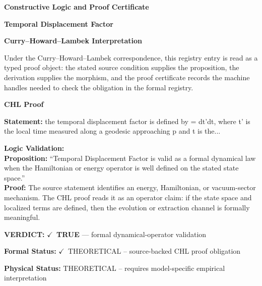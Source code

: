 \clearpage
\begingroup\tzpsupportsetup
\noindent\textbf{\fontsize{10.8pt}{12.8pt}\selectfont [ID 0007] Constructive Logic and Proof Certificate}\par
\noindent\textbf{\fontsize{10pt}{12pt}\selectfont Temporal Displacement Factor}\par
\vspace{0.45em}
\begingroup
\footnotesize
\setlength{\parskip}{0.22em}
\setlength{\parindent}{0pt}
\noindent\textbf{Curry--Howard--Lambek Interpretation}\par
Under the Curry--Howard--Lambek correspondence, this registry entry is read as a typed proof
object: the stated source condition supplies the proposition, the derivation supplies the
morphism, and the proof certificate records the machine handles needed to check the obligation
in the formal registry.

\vspace{0.45em}
\noindent\textbf{CHL Proof}\par
\textbf{Statement:} the temporal displacement factor  is defined by  = dt'dt, where t' is the local
time measured along a geodesic approaching p and t is the...

\textbf{Logic Validation:}\\
\textbf{Proposition:} ``Temporal Displacement Factor is valid as a formal dynamical law when the Hamiltonian or
energy operator is well defined on the stated state space.''\\
\textbf{Proof:} The source statement identifies an energy, Hamiltonian, or vacuum-sector mechanism. The
CHL proof reads it as an operator claim: if the state space and localized terms are
defined, then the evolution or extraction channel is formally meaningful.

\textbf{VERDICT:} \ensuremath{\checkmark}\ \textbf{TRUE} --- formal dynamical-operator validation

\textbf{Formal Status:} \ensuremath{\checkmark}\ THEORETICAL -- source-backed CHL proof obligation

\textbf{Physical Status:} THEORETICAL -- requires model-specific empirical interpretation
\par\vspace{0.45em}
\par
\ifTZPDarkEdition
{}
\fi
\endgroup
\endgroup
